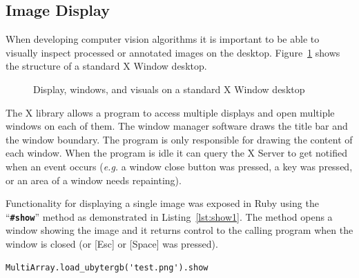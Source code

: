 \documentclass[12pt,a4paper,oneside,openright]{book}
\newcommand{\eg}{\emph{e.g.} }
\newcommand{\fig}[1]{Figure~\ref{fig:#1}}
\newcommand{\lst}[1]{Listing~\ref{lst:#1}}
\newcommand{\code}[1]{``\texttt{\textbf{\textcolor{codegray}{\small{#1}}}}''}
\begin{document}
\begin{CJK}{UTF8}{}
\section{Image Display}\label{cha:display}
When developing computer vision algorithms it is important to be able to visually inspect processed or annotated images on the desktop. \fig{x11} shows the structure of a standard X Window desktop.
\begin{figure}[htbp]
  \begin{center}
    \caption{Display, windows, and visuals on a standard X Window desktop\label{fig:x11}}
  \end{center}
\end{figure}
The X library allows a program to access multiple displays and open multiple windows on each of them. The window manager software draws the title bar and the window boundary. The program is only responsible for drawing the content of each window. When the program is idle it can query the X Server to get notified when an event occurs (\eg a window close button was pressed, a key was pressed, or an area of a window needs repainting).

Functionality for displaying a single image was exposed in Ruby using the \code{\#show} method as demonstrated in \lst{show1}. The method opens a window showing the image and it returns control to the calling program when the window is closed (or [Esc] or [Space] was pressed).
\lstset{language=Ruby,frame=single,numbers=none}
\begin{lstlisting}[float,caption={Loading and displaying an image},label=lst:show1]
MultiArray.load_ubytergb('test.png').show
\end{lstlisting}


\end{CJK}
\end{document}
